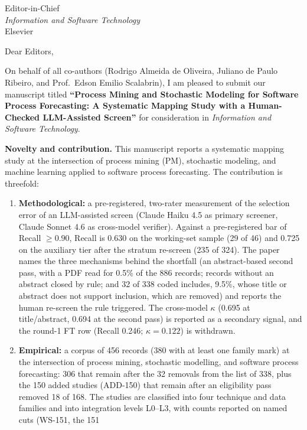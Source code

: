 \documentclass[11pt,a4paper]{letter}
\begin{document}
\begin{letter}{Editor-in-Chief \\ \emph{Information and Software Technology} \\ Elsevier}

\opening{Dear Editors,}

On behalf of all co-authors (Rodrigo Almeida de Oliveira, Juliano de Paulo
Ribeiro, and Prof.\ Edson Emilio Scalabrin), I am pleased to submit our
manuscript titled
\textbf{``Process Mining and Stochastic Modeling for Software Process
Forecasting: A Systematic Mapping Study with a Human-Checked LLM-Assisted
Screen''}
for consideration in \emph{Information and Software Technology}.

\medskip\noindent\textbf{Novelty and contribution.}
This manuscript reports a systematic mapping study at the
intersection of process mining (PM), stochastic modeling, and machine
learning applied to software process forecasting. The contribution is
threefold:
\begin{enumerate}
\item \textbf{Methodological:} a pre-registered, two-rater measurement
      of the selection error of an LLM-assisted screen (Claude Haiku 4.5
      as primary screener, Claude Sonnet 4.6 as cross-model verifier).
      Against a pre-registered bar of Recall $\geq 0.90$, Recall is 0.630
      on the working-set sample (29 of 46) and 0.725 on the auxiliary
      tier after the stratum re-screen (235 of 324). The paper names the
      three mechanisms behind the shortfall (an abstract-based second
      pass, with a PDF read for 0.5\% of the 886 records; records without
      an abstract closed by rule; and 32 of 338 coded includes, 9.5\%,
      whose title or abstract does not support inclusion, which are
      removed) and reports the human re-screen the rule triggered. The
      cross-model $\kappa$ (0.695 at title/abstract, 0.694 at the second
      pass) is reported as a secondary signal, and the round-1 FT row
      (Recall 0.246; $\kappa = 0.122$) is withdrawn.
\item \textbf{Empirical:} a corpus of 456 records (380 with at least one family mark) at the intersection of
      process mining, stochastic modelling, and software process
      forecasting: 306 that remain after the 32 removals from the list of
      338, plus the 150 added studies (ADD-150) that remain after an
      eligibility pass removed 18 of 168. The studies are classified into
      four technique and data families and into integration levels
      L0--L3, with counts reported on named cuts (WS-151, the 151

\end{enumerate}
\end{letter}
\end{document}
